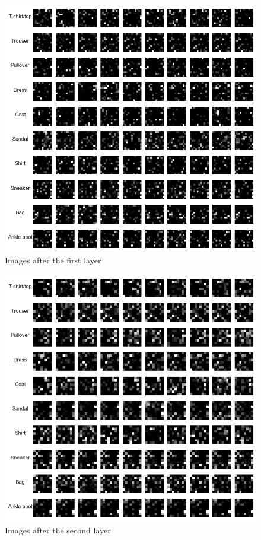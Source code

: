 \documentclass[10pt,a4paper,twoside]{tau}
\begin{document}
\begin{figure}[htbp]
\centering
\includegraphics[scale=0.43]{images/first_layer.png}
\caption{Images after the first layer}
\label{fig:first-layer}
\end{figure}

\begin{figure}[htbp]
\centering
\includegraphics[scale=0.43]{images/second_layer.png}
\caption{Images after the second layer}
\label{fig:second-layer}
\end{figure}
\end{document}
